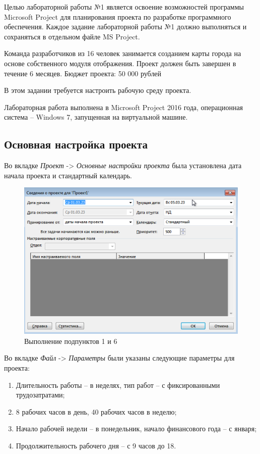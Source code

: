 Целью лабораторной работы №1 является освоение возможностей программы Microsoft Project для планирования проекта по разработке программного обеспечения.
Каждое задание лабораторной работы №1 должно выполняться и сохраняться в отдельном файле MS Project.

Команда разработчиков из 16 человек занимается созданием карты города на основе собственного модуля отображения. 
Проект должен быть завершен в течение 6 месяцев. Бюджет проекта: 50 000 рублей

\newpage
{}
В этом задании требуется настроить рабочую среду проекта.

Лабораторная работа выполнена в Microsoft Project 2016 года, операционная система -- Windows 7, запущенная на виртуальной машине.

\subsection*{Основная настройка проекта}
Во вкладке \textit{Проект} -> \textit{Основные настройки проекта} была установлена дата начала проекта и стандартный календарь.

\FloatBarrier
\begin{figure}[h]	
	\begin{center}
		\includegraphics[width=\linewidth]{inc/1-1.png}
	\end{center}
	\captionsetup{justification=centering}
	\caption{Выполнение подпунктов 1 и 6}
\end{figure}
\FloatBarrier

\newpage
Во вкладке \textit{Файл} -> \textit{Параметры} были указаны следующие параметры для проекта:
\begin{enumerate}
	\item Длительность работы -- в неделях, тип работ -- с фиксированными трудозатратами;
	\item 8 рабочих часов в день, 40 рабочих часов в неделю;
	\item Начало рабочей недели -- в понедельник, начало финансового года -- с января;
	\item Продолжительность рабочего дня -- с 9 часов до 18.
\end{enumerate}

